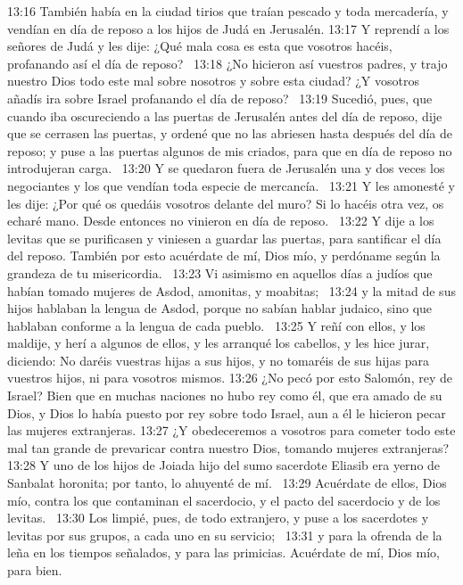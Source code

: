 13:16 También había en la ciudad tirios que traían pescado y toda mercadería, y vendían en día de reposo a los hijos de Judá en Jerusalén. 
13:17 Y reprendí a los señores de Judá y les dije: ¿Qué mala cosa es esta que vosotros hacéis, profanando así el día de reposo?  
13:18 ¿No hicieron así vuestros padres, y trajo nuestro Dios todo este mal sobre nosotros y sobre esta ciudad? ¿Y vosotros añadís ira sobre Israel profanando el día de reposo?  
13:19 Sucedió, pues, que cuando iba oscureciendo a las puertas de Jerusalén antes del día de reposo, dije que se cerrasen las puertas, y ordené que no las abriesen hasta después del día de reposo; y puse a las puertas algunos de mis criados, para que en día de reposo no introdujeran carga.  
13:20 Y se quedaron fuera de Jerusalén una y dos veces los negociantes y los que vendían toda especie de mercancía.  
13:21 Y les amonesté y les dije: ¿Por qué os quedáis vosotros delante del muro? Si lo hacéis otra vez, os echaré mano. Desde entonces no vinieron en día de reposo.  
13:22 Y dije a los levitas que se purificasen y viniesen a guardar las puertas, para santificar el día del reposo. También por esto acuérdate de mí, Dios mío, y perdóname según la grandeza de tu misericordia.  
13:23 Vi asimismo en aquellos días a judíos que habían tomado mujeres de Asdod, amonitas, y moabitas;  
13:24 y la mitad de sus hijos hablaban la lengua de Asdod, porque no sabían hablar judaico, sino que hablaban conforme a la lengua de cada pueblo.  
13:25 Y reñí con ellos, y los maldije, y herí a algunos de ellos, y les arranqué los cabellos, y les hice jurar, diciendo: No daréis vuestras hijas a sus hijos, y no tomaréis de sus hijas para vuestros hijos, ni para vosotros mismos. 
13:26 ¿No pecó por esto Salomón, rey de Israel? Bien que en muchas naciones no hubo rey como él, que era amado de su Dios, y Dios lo había puesto por rey sobre todo Israel, aun a él le hicieron pecar las mujeres extranjeras. 
13:27 ¿Y obedeceremos a vosotros para cometer todo este mal tan grande de prevaricar contra nuestro Dios, tomando mujeres extranjeras?  
13:28 Y uno de los hijos de Joiada hijo del sumo sacerdote Eliasib era yerno de Sanbalat horonita; por tanto, lo ahuyenté de mí.  
13:29 Acuérdate de ellos, Dios mío, contra los que contaminan el sacerdocio, y el pacto del sacerdocio y de los levitas.  
13:30 Los limpié, pues, de todo extranjero, y puse a los sacerdotes y levitas por sus grupos, a cada uno en su servicio;  
13:31 y para la ofrenda de la leña en los tiempos señalados, y para las primicias. Acuérdate de mí, Dios mío, para bien.

